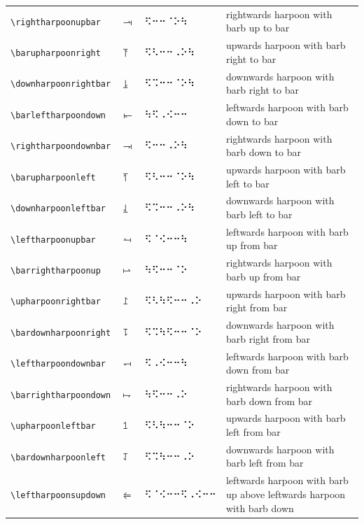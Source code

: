 \documentclass[oneside]{article}
\begin{document}
\begin{longtable}{llll}
\verb|\rightharpoonupbar| & $\rightharpoonupbar$ &   ⠫⠒⠒⠈⠕⠳   & {rightwards harpoon with barb up to bar} \\[2ex]
\verb|\barupharpoonright| & $\barupharpoonright$ &   ⠫⠣⠒⠒⠠⠕⠳   & {upwards harpoon with barb right to bar} \\[2ex]
\verb|\downharpoonrightbar| & $\downharpoonrightbar$ &   ⠫⠩⠒⠒⠈⠕⠳   & {downwards harpoon with barb right to bar} \\[2ex]
\verb|\barleftharpoondown| & $\barleftharpoondown$ &   ⠳⠫⠠⠪⠒⠒   & {leftwards harpoon with barb down to bar} \\[2ex]
\verb|\rightharpoondownbar| & $\rightharpoondownbar$ &   ⠫⠒⠒⠠⠕⠳   & {rightwards harpoon with barb down to bar} \\[2ex]
\verb|\barupharpoonleft| & $\barupharpoonleft$ &   ⠫⠣⠒⠒⠈⠕⠳   & {upwards harpoon with barb left to bar} \\[2ex]
\verb|\downharpoonleftbar| & $\downharpoonleftbar$ &   ⠫⠩⠒⠒⠠⠕⠳   & {downwards harpoon with barb left to bar} \\[2ex]
\verb|\leftharpoonupbar| & $\leftharpoonupbar$ &   ⠫⠈⠪⠒⠒⠳   & {leftwards harpoon with barb up from bar} \\[2ex]
\verb|\barrightharpoonup| & $\barrightharpoonup$ &   ⠳⠫⠒⠒⠈⠕   & {rightwards harpoon with barb up from bar} \\[2ex]
\verb|\upharpoonrightbar| & $\upharpoonrightbar$ &   ⠫⠣⠳⠫⠒⠒⠠⠕   & {upwards harpoon with barb right from bar} \\[2ex]
\verb|\bardownharpoonright| & $\bardownharpoonright$ &   ⠫⠩⠳⠫⠒⠒⠈⠕   & {downwards harpoon with barb right from bar} \\[2ex]
\verb|\leftharpoondownbar| & $\leftharpoondownbar$ &   ⠫⠠⠪⠒⠒⠳   & {leftwards harpoon with barb down from bar} \\[2ex]
\verb|\barrightharpoondown| & $\barrightharpoondown$ &   ⠳⠫⠒⠒⠠⠕   & {rightwards harpoon with barb down from bar} \\[2ex]
\verb|\upharpoonleftbar| & $\upharpoonleftbar$ &   ⠫⠣⠳⠒⠒⠈⠕   & {upwards harpoon with barb left from bar} \\[2ex]
\verb|\bardownharpoonleft| & $\bardownharpoonleft$ &   ⠫⠩⠳⠒⠒⠠⠕   & {downwards harpoon with barb left from bar} \\[2ex]
\verb|\leftharpoonsupdown| & $\leftharpoonsupdown$ &   ⠫⠈⠪⠒⠒⠫⠠⠪⠒⠒   & \begin{minipage}[t]{8cm}{leftwards harpoon with barb up above leftwards harpoon with barb down}
\end{minipage}\\[4ex]

\end{longtable}
\end{document}

